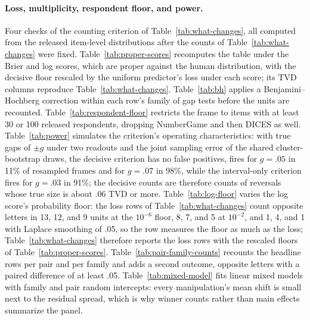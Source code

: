 \documentclass[11pt]{article}
\begin{document}
\paragraph{Loss, multiplicity, respondent floor, and power.}
Four checks of the counting criterion of Table~\ref{tab:what-changes}, all computed from the released item-level distributions after the counts of Table~\ref{tab:what-changes} were fixed. Table~\ref{tab:proper-scores} recomputes the table under the Brier and log scores, which are proper against the human distribution, with the decisive floor rescaled by the uniform predictor's loss under each score; its TVD columns reproduce Table~\ref{tab:what-changes}. Table~\ref{tab:bh} applies a Benjamini--Hochberg correction within each row's family of gap tests before the units are recounted. Table~\ref{tab:respondent-floor} restricts the frame to items with at least 30 or 100 released respondents, dropping NumberGame and then DICES as well. Table~\ref{tab:power} simulates the criterion's operating characteristics: with true gaps of $\pm g$ under two readouts and the joint sampling error of the shared cluster-bootstrap draws, the decisive criterion has no false positives, fires for $g=.05$ in 11\% of resampled frames and for $g=.07$ in 98\%, while the interval-only criterion fires for $g=.03$ in 91\%; the decisive counts are therefore counts of reversals whose true size is about .06 TVD or more. Table~\ref{tab:log-floor} varies the log score's probability floor: the loss rows of Table~\ref{tab:what-changes} count opposite letters in 13, 12, and 9 units at the $10^{-6}$ floor, 8, 7, and 5 at $10^{-2}$, and 1, 4, and 1 with Laplace smoothing of .05, so the row measures the floor as much as the loss; Table~\ref{tab:what-changes} therefore reports the loss rows with the rescaled floors of Table~\ref{tab:proper-scores}. Table~\ref{tab:pair-family-counts} recounts the headline rows per pair and per family and adds a second outcome, opposite letters with a paired difference of at least .05. Table~\ref{tab:mixed-model} fits linear mixed models with family and pair random intercepts: every manipulation's mean shift is small next to the residual spread, which is why winner counts rather than main effects summarize the panel.










\FloatBarrier
\end{document}
